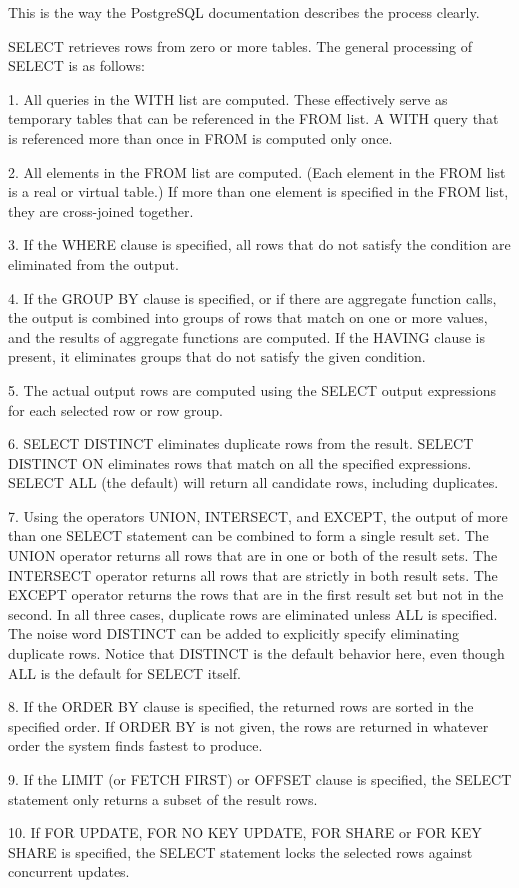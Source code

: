 This is the way the PostgreSQL documentation describes the process clearly.

\begin{smallverbatim}
 

SELECT retrieves rows from zero or more tables. The general processing of SELECT is as follows:

1. All queries in the WITH list are computed. 
These effectively serve as temporary tables that can be referenced in the FROM list. 
A WITH query that is referenced more than once in FROM is computed only once. 


2. All elements in the FROM list are computed. 
(Each element in the FROM list is a real or virtual table.) 
If more than one element is specified in the FROM list, they are cross-joined together.


3. If the WHERE clause is specified, all rows that do not satisfy the condition 
are eliminated from the output. 


4. If the GROUP BY clause is specified, or if there are aggregate function calls, 
the output is combined into groups of rows that match on one or more values, 
and the results of aggregate functions are computed. 
If the HAVING clause is present, it eliminates groups that do not satisfy the 
given condition. 


5. The actual output rows are computed using the SELECT output expressions 
for each selected row or row group. 


6. SELECT DISTINCT eliminates duplicate rows from the result. 
SELECT DISTINCT ON eliminates rows that match on all the specified expressions. 
SELECT ALL (the default) will return all candidate rows, including duplicates. 


7. Using the operators UNION, INTERSECT, and EXCEPT, the output of more than one 
SELECT statement can be combined to form a single result set. 
The UNION operator returns all rows that are in one or both of the result sets. 
The INTERSECT operator returns all rows that are strictly in both result sets. 
The EXCEPT operator returns the rows that are in the first result set but not in the second. 
In all three cases, duplicate rows are eliminated unless ALL is specified. 
The noise word DISTINCT can be added to explicitly specify eliminating duplicate rows. 
Notice that DISTINCT is the default behavior here, even though ALL is the default for SELECT itself. 


8. If the ORDER BY clause is specified, the returned rows are sorted in the specified order. 
If ORDER BY is not given, the rows are returned in whatever order the system finds fastest to produce. 


9. If the LIMIT (or FETCH FIRST) or OFFSET clause is specified, the SELECT statement only returns 
a subset of the result rows. 

10. If FOR UPDATE, FOR NO KEY UPDATE, FOR SHARE or FOR KEY SHARE is specified, 
the SELECT statement locks the selected rows against concurrent updates. 

\end{smallverbatim}



